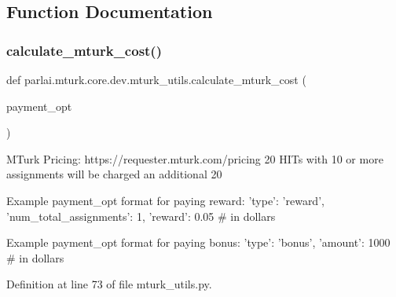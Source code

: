 \subsection{Function Documentation}
\mbox{\label{namespaceparlai_1_1mturk_1_1core_1_1dev_1_1mturk__utils_ab0dab541f46c0b18e96bcbbb536bddf6}} 
\subsubsection{\texorpdfstring{calculate\+\_\+mturk\+\_\+cost()}{calculate\_mturk\_cost()}}
{\footnotesize\ttfamily def parlai.\+mturk.\+core.\+dev.\+mturk\+\_\+utils.\+calculate\+\_\+mturk\+\_\+cost (\begin{DoxyParamCaption}\item[{}]{payment\+\_\+opt }\end{DoxyParamCaption})}

\begin{DoxyVerb}MTurk Pricing: https://requester.mturk.com/pricing
20%
HITs with 10 or more assignments will be charged an additional
20%

Example payment_opt format for paying reward:
{
    'type': 'reward',
    'num_total_assignments': 1,
    'reward': 0.05  # in dollars
}

Example payment_opt format for paying bonus:
{
    'type': 'bonus',
    'amount': 1000  # in dollars
}
\end{DoxyVerb}
 

Definition at line 73 of file mturk\+\_\+utils.\+py.

\mbox{\label{namespaceparlai_1_1mturk_1_1core_1_1dev_1_1mturk__utils_af89757251500a96195029eb22e58e516}} 
